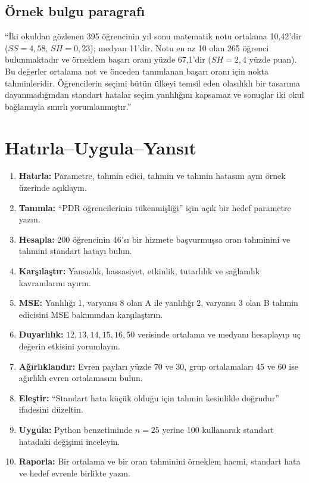\subsection{Örnek bulgu paragrafı}

``İki okuldan gözlenen 395 öğrencinin yıl sonu matematik notu ortalama
10,42'dir ($SS=4{,}58$, $SH=0{,}23$); medyan 11'dir. Notu en az 10 olan 265
öğrenci bulunmaktadır ve örneklem başarı oranı yüzde 67,1'dir
($SH=2{,}4$ yüzde puan). Bu değerler ortalama not ve önceden tanımlanan başarı
oranı için nokta tahminleridir. Öğrencilerin seçimi bütün ülkeyi temsil eden
olasılıklı bir tasarıma dayanmadığından standart hatalar seçim yanlılığını
kapsamaz ve sonuçlar iki okul bağlamıyla sınırlı yorumlanmıştır.''




\section*{Hatırla--Uygula--Yansıt}

\begin{enumerate}
\renewcommand{\labelenumi}{\textbf{\Alph{enumi}.}}
  \item \textbf{Hatırla:} Parametre, tahmin edici, tahmin ve tahmin hatasını aynı örnek üzerinde açıklayın.
  \item \textbf{Tanımla:} ``PDR öğrencilerinin tükenmişliği'' için açık bir hedef parametre yazın.
  \item \textbf{Hesapla:} 200 öğrencinin 46'sı bir hizmete başvurmuşsa oran tahminini ve tahmini standart hatayı bulun.
  \item \textbf{Karşılaştır:} Yansızlık, hassasiyet, etkinlik, tutarlılık ve sağlamlık kavramlarını ayırın.
  \item \textbf{MSE:} Yanlılığı 1, varyansı 8 olan A ile yanlılığı 2, varyansı 3 olan B tahmin edicisini MSE bakımından karşılaştırın.
  \item \textbf{Duyarlılık:} $12,13,14,15,16,50$ verisinde ortalama ve medyanı hesaplayıp uç değerin etkisini yorumlayın.
  \item \textbf{Ağırlıklandır:} Evren payları yüzde 70 ve 30, grup ortalamaları 45 ve 60 ise ağırlıklı evren ortalamasını bulun.
  \item \textbf{Eleştir:} ``Standart hata küçük olduğu için tahmin kesinlikle doğrudur'' ifadesini düzeltin.
  \item \textbf{Uygula:} Python benzetiminde $n=25$ yerine 100 kullanarak standart hatadaki değişimi inceleyin.
  \item \textbf{Raporla:} Bir ortalama ve bir oran tahminini örneklem hacmi, standart hata ve hedef evrenle birlikte yazın.
\end{enumerate}